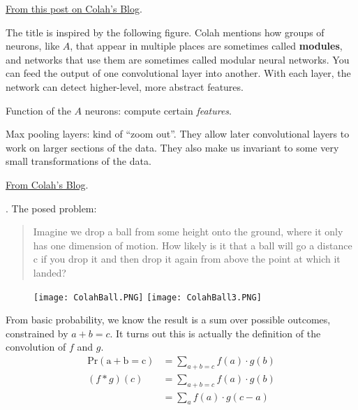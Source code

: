 

\p \href{https://colah.github.io/posts/2014-07-Conv-Nets-Modular/}{From this post on Colah's Blog}. 

\myspace The title is inspired by the following figure. Colah mentions how groups of neurons, like $A$, that appear in multiple places are sometimes called \textbf{modules}, and networks that use them are sometimes called modular neural networks. You can feed the output of one convolutional layer into another. With each layer, the network can detect higher-level, more abstract features.
\begin{compactitem}[$\longrightarrow$]
	\item Function of the $A$ neurons: compute certain \textit{features}.
	
	 \item Max pooling layers: kind of ``zoom out''. They allow later convolutional layers to work on larger sections of the data. They also make us invariant to some very small transformations of the data.
\end{compactitem}





\p \href{https://colah.github.io/posts/2014-07-Understanding-Convolutions/}{From Colah's Blog}. 

\p {}. The posed problem:
\begin{footnotesize}
\begin{quote}
	Imagine we drop a ball from some height onto the ground, where it only has one dimension of motion. How likely is it that a ball will go a distance c if you drop it and then drop it again from above the point at which it landed?
\end{quote}
\end{footnotesize}

\begin{figure}[h!]
	\centering
	\texttt{[image: ColahBall.PNG]}
	\hspace{2cm}
	\texttt{[image: ColahBall3.PNG]}
\end{figure}

From basic probability, we know the result is a sum over possible outcomes, constrained by $a + b = c$. It turns out this is actually the definition of the convolution of $f$ and $g$. 
\begin{align}
	\mathrm{Pr(a + b = c)} &= \sum_{a + b = c} f(a) \cdot g(b) \\
	(f * g)(c) &= \sum_{a + b = c} f(a) \cdot g(b)\\
	&= \sum_a f(a) \cdot g(c - a)
\end{align}

